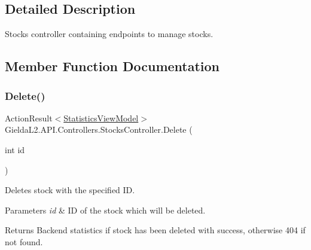 \subsection{Detailed Description}
Stocks controller containing endpoints to manage stocks. 



\subsection{Member Function Documentation}
\mbox{\label{class_gielda_l2_1_1_a_p_i_1_1_controllers_1_1_stocks_controller_ad83a73170f0d55d1b08353e76adef581}} 
\subsubsection{\texorpdfstring{Delete()}{Delete()}}
{\footnotesize\ttfamily Action\+Result$<$\mbox{\hyperlink{class_gielda_l2_1_1_a_p_i_1_1_view_models_1_1_view_1_1_statistics_view_model}{Statistics\+View\+Model}}$>$ Gielda\+L2.\+A\+P\+I.\+Controllers.\+Stocks\+Controller.\+Delete (\begin{DoxyParamCaption}\item[{int}]{id }\end{DoxyParamCaption})}



Deletes stock with the specified ID. 


\begin{DoxyParams}{Parameters}
{\em id} & ID of the stock which will be deleted.\\
\hline
\end{DoxyParams}
\begin{DoxyReturn}{Returns}
Backend statistics if stock has been deleted with success, otherwise 404 if not found.
\end{DoxyReturn}
\mbox{\label{class_gielda_l2_1_1_a_p_i_1_1_controllers_1_1_stocks_controller_a3265a9c160c9a1f7f493423739f90561}} 
